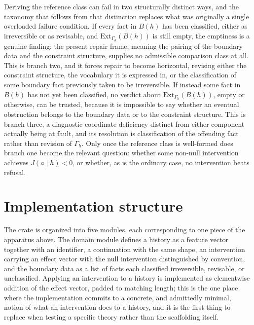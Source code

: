 \documentclass[11pt]{article}
\begin{document}
Deriving the reference class can fail in two structurally distinct ways, and the taxonomy that follows from that distinction replaces what was originally a single overloaded failure condition. If every fact in $B(h)$ has been classified, either as irreversible or as revisable, and $\mathrm{Ext}_{\Gamma_h}(B(h))$ is still empty, the emptiness is a genuine finding: the present repair frame, meaning the pairing of the boundary data and the constraint structure, supplies no admissible comparison class at all. This is branch two, and it forces repair to become horizontal, revising either the constraint structure, the vocabulary it is expressed in, or the classification of some boundary fact previously taken to be irreversible. If instead some fact in $B(h)$ has not yet been classified, no verdict about $\mathrm{Ext}_{\Gamma_h}(B(h))$, empty or otherwise, can be trusted, because it is impossible to say whether an eventual obstruction belongs to the boundary data or to the constraint structure. This is branch three, a diagnostic-coordinate deficiency distinct from either component actually being at fault, and its resolution is classification of the offending fact rather than revision of $\Gamma_h$. Only once the reference class is well-formed does branch one become the relevant question: whether some non-null intervention achieves $J(a \mid h) < 0$, or whether, as is the ordinary case, no intervention beats refusal.

\section{Implementation structure}

The crate is organized into five modules, each corresponding to one piece of the apparatus above. The domain module defines a history as a feature vector together with an identifier, a continuation with the same shape, an intervention carrying an effect vector with the null intervention distinguished by convention, and the boundary data as a list of facts each classified irreversible, revisable, or unclassified. Applying an intervention to a history is implemented as elementwise addition of the effect vector, padded to matching length; this is the one place where the implementation commits to a concrete, and admittedly minimal, notion of what an intervention does to a history, and it is the first thing to replace when testing a specific theory rather than the scaffolding itself.
\end{document}
